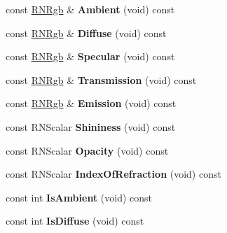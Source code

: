 \begin{DoxyCompactItemize}
\item 
const \hyperlink{class_r_n_rgb}{R\+N\+Rgb} \& {\bfseries Ambient} (void) const \hypertarget{class_r3_brdf_a408a8070d6aaafd7e70e070347af70b1}{}\label{class_r3_brdf_a408a8070d6aaafd7e70e070347af70b1}

\item 
const \hyperlink{class_r_n_rgb}{R\+N\+Rgb} \& {\bfseries Diffuse} (void) const \hypertarget{class_r3_brdf_adce784a5e7fddc843bcbc054096b8c4f}{}\label{class_r3_brdf_adce784a5e7fddc843bcbc054096b8c4f}

\item 
const \hyperlink{class_r_n_rgb}{R\+N\+Rgb} \& {\bfseries Specular} (void) const \hypertarget{class_r3_brdf_ad919fa8cdc2f4d9d7a62d87608a569cd}{}\label{class_r3_brdf_ad919fa8cdc2f4d9d7a62d87608a569cd}

\item 
const \hyperlink{class_r_n_rgb}{R\+N\+Rgb} \& {\bfseries Transmission} (void) const \hypertarget{class_r3_brdf_a489b21c16a877e131dcb014eaa83011c}{}\label{class_r3_brdf_a489b21c16a877e131dcb014eaa83011c}

\item 
const \hyperlink{class_r_n_rgb}{R\+N\+Rgb} \& {\bfseries Emission} (void) const \hypertarget{class_r3_brdf_a840588cbc4f2bf9cf990e371db7943e2}{}\label{class_r3_brdf_a840588cbc4f2bf9cf990e371db7943e2}

\item 
const R\+N\+Scalar {\bfseries Shininess} (void) const \hypertarget{class_r3_brdf_aa6b02a3d99da73c2d051fabdc02e59b3}{}\label{class_r3_brdf_aa6b02a3d99da73c2d051fabdc02e59b3}

\item 
const R\+N\+Scalar {\bfseries Opacity} (void) const \hypertarget{class_r3_brdf_a5b7dd03ca9921d16233115aab6a569ca}{}\label{class_r3_brdf_a5b7dd03ca9921d16233115aab6a569ca}

\item 
const R\+N\+Scalar {\bfseries Index\+Of\+Refraction} (void) const \hypertarget{class_r3_brdf_a08ecc6b83f258a1389b3fd5ab5c2c9c3}{}\label{class_r3_brdf_a08ecc6b83f258a1389b3fd5ab5c2c9c3}

\item 
const int {\bfseries Is\+Ambient} (void) const \hypertarget{class_r3_brdf_a645755513d418a8aea142e80a7e26702}{}\label{class_r3_brdf_a645755513d418a8aea142e80a7e26702}

\item 
const int {\bfseries Is\+Diffuse} (void) const \hypertarget{class_r3_brdf_a17d5ec3069b66e9c8f06b937162aa3f2}{}\label{class_r3_brdf_a17d5ec3069b66e9c8f06b937162aa3f2}


\end{DoxyCompactItemize}
